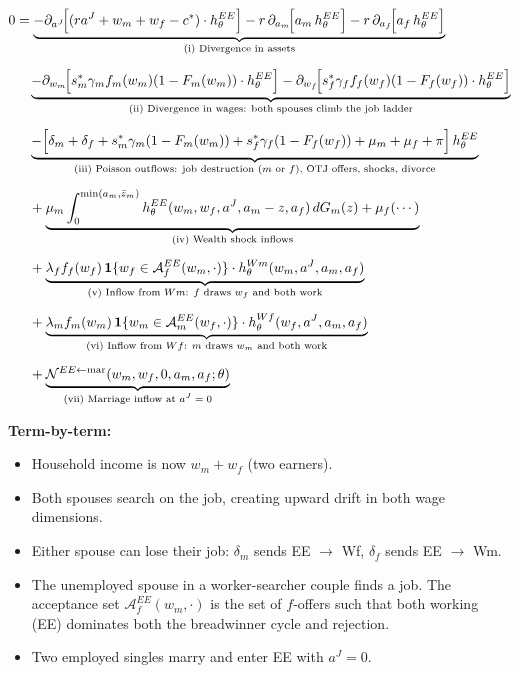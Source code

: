 \documentclass{article}
\begin{document}
\begin{align}
    0 &= \underbrace{-\partial_{a^J}\!\Big[(ra^J + w_m + w_f - c^*)\cdot h_\theta^{EE}\Big] - r\,\partial_{a_m}\!\Big[a_m\, h_\theta^{EE}\Big] - r\,\partial_{a_f}\!\Big[a_f\, h_\theta^{EE}\Big]}_{\text{(i) Divergence in assets}} \notag\\[6pt]
    &\quad \underbrace{- \partial_{w_m}\!\Big[s_m^*\gamma_m f_m(w_m)(1-F_m(w_m))\cdot h_\theta^{EE}\Big] - \partial_{w_f}\!\Big[s_f^*\gamma_f f_f(w_f)(1-F_f(w_f))\cdot h_\theta^{EE}\Big]}_{\text{(ii) Divergence in wages: both spouses climb the job ladder}} \notag\\[6pt]
    &\quad \underbrace{- \Big[\delta_m + \delta_f + s_m^*\gamma_m(1-F_m(w_m)) + s_f^*\gamma_f(1-F_f(w_f)) + \mu_m + \mu_f + \pi\Big]\, h_\theta^{EE}}_{\text{(iii) Poisson outflows: job destruction ($m$ or $f$), OTJ offers, shocks, divorce}} \notag\\[6pt]
    &\quad + \underbrace{\mu_m \int_0^{\min(a_m,\bar{z}_m)} h_\theta^{EE}(w_m, w_f, a^J, a_m-z, a_f)\, dG_m(z) + \mu_f(\cdots)}_{\text{(iv) Wealth shock inflows}} \notag\\[6pt]
    &\quad + \underbrace{\lambda_f f_f(w_f)\,\mathbf{1}\{w_f \in \mathcal{A}_f^{EE}(w_m,\cdot)\}\cdot h_\theta^{Wm}(w_m, a^J, a_m, a_f)}_{\text{(v) Inflow from $Wm$: $f$ draws $w_f$ and both work}} \notag\\[6pt]
    &\quad + \underbrace{\lambda_m f_m(w_m)\,\mathbf{1}\{w_m \in \mathcal{A}_m^{EE}(w_f,\cdot)\}\cdot h_\theta^{Wf}(w_f, a^J, a_m, a_f)}_{\text{(vi) Inflow from $Wf$: $m$ draws $w_m$ and both work}} \notag\\[6pt]
    &\quad + \underbrace{\mathcal{N}^{EE\leftarrow\text{mar}}(w_m, w_f, 0, a_m, a_f;\theta)}_{\text{(vii) Marriage inflow at $a^J=0$}}
    \label{eq:KFE_EE}
\end{align}

\textbf{Term-by-term:}
\begin{itemize}
    \item[(i)] Household income is now $w_m + w_f$ (two earners).
    \item[(ii)] Both spouses search on the job, creating upward drift in both wage dimensions.
    \item[(iii)] Either spouse can lose their job: $\delta_m$ sends EE $\to$ Wf, $\delta_f$ sends EE $\to$ Wm.
    \item[(v)--(vi)] The unemployed spouse in a worker-searcher couple finds a job. The acceptance set $\mathcal{A}_f^{EE}(w_m,\cdot)$ is the set of $f$-offers such that both working (EE) dominates both the breadwinner cycle and rejection.
    \item[(vii)] Two employed singles marry and enter EE with $a^J = 0$.
\end{itemize}
\end{document}
